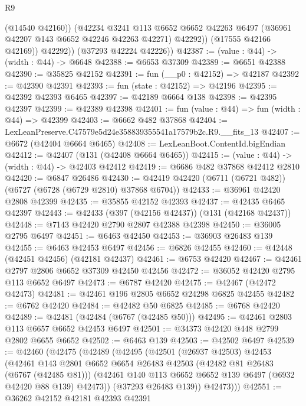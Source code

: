 \begin{lexlean}{R9}
\begin{coremodule}
                (@14540 @42160))
              (@42234
                @3241
                @113
                @6652
                @6652
                @42263
                @6497
                (@36961 @42207 @143 @6652 @42246 @42263 @42271)
                @42292))
            (@17555 @42166 @42169))
          @42292))
      (@37293 @42224 @42226))
@42387 := (value : @44) -> (width : @44) -> @6648
@42388 := @6653 @37309
@42389 := @6651 @42388
@42390 := @35825 @42152
@42391 := fun (__p0 : @42152) => @42187
@42392 := @42390 @42391
@42393 := fun (state : @42152) => @42196
@42395 := @42392 @42393 @6465
@42397 := @42189 @6664 @138
@42398 := @42395 @42397
@42399 := @42389 @42398
@42401 := fun (value : @44) => fun (width : @44) => @42399
@42403 := @6662 @482 @37868
@42404 := LexLeanPreserve.C47579e5d24e358839355541a17579b2c.R9.__fits_13
@42407 := @6672 (@42404 @6664 @6465)
@42408 := LexLeanBoot.ContentId.bigEndian
@42412 := @42407 (@131 (@42408 @6664 @6465))
@42415 := (value : @44) -> (width : @44) -> @42403 @42412
@42419 := @6686 @482 @37868 @42412 @2810
@42420 := @6847 @26486
@42430 := @42419 @42420 (@6711 (@6721 @482)) (@6727 (@6728 (@6729 @2810) @37868 @6704))
@42433 := @36961 @42420 @2808 @42399
@42435 := @35855 @42152 @42393
@42437 := @42435 @6465 @42397
@42443 := @42433 (@397 (@42156 @42437)) (@131 (@42168 @42437))
@42448 := @7143 @42420 @2790 @2807 @42388 @42398
@42450 := @36005 @2795 @6497
@42451 := @6463 @42450
@42453 := @36903 @26483 @139
@42455 := @6463 @42453 @6497
@42456 := @6826 @42455
@42460 := @42448 (@42451 @42456) (@42181 @42437)
@42461 := @6753 @42420
@42467 := @42461 @2797 @2806 @6652 @37309 @42450 @42456
@42472 := @36052 @42420 @2795 @113 @6652 @6497
@42473 := @6787 @42420
@42475 := @42467 (@42472 @42473)
@42481 := @42461 @196 @2805 @6652 @24298 @6825 @42455
@42482 := @6762 @42420
@42484 := @42482 @50 @6825
@42485 := @6768 @42420
@42489 := @42481 (@42484 (@6767 (@42485 @50)))
@42495 := @42461 @2803 @113 @6657 @6652 @42453 @6497
@42501 := @34373 @42420 @448 @2799 @2802 @6655 @6652
@42502 := @6463 @139
@42503 := @42502 @6497
@42539 := @42460
    (@42475
      (@42489
        (@42495
          (@42501
            (@26937 @42503)
            @42453
            (@42461
              @143
              @2801
              @6652
              @6654
              @26483
              @42503
              (@42482 @81 @26483 (@6767 (@42485 @81)))
              (@42461 @140 @113 @6652 @6652 @139 @6497 (@6932 @42420 @88 @139) @42473))
            (@37293 @26483 @139))
          @42473)))
@42551 := @36262
    @42152
    @42181
    @42393
    @42391

\end{coremodule}
\end{lexlean}
